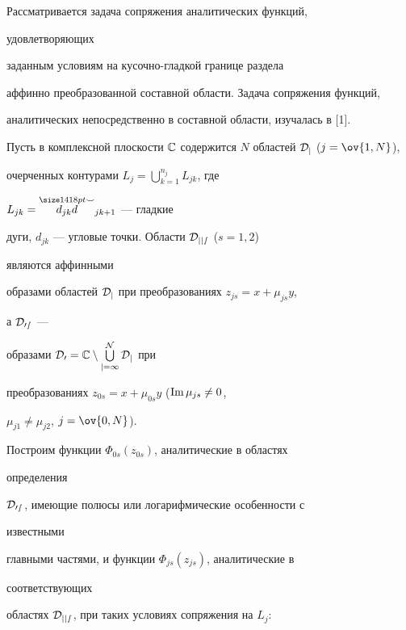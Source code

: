  




\maketitle 


\label{begin} 


 


Рассматривается задача сопряжения аналитических функций, 


удовлетворяющих 


заданным условиям на кусочно-гладкой границе раздела 


аффинно преобразованной составной области. Задача сопряжения функций, 


аналитических непосредственно в составной области, изучалась в [1]. 


 


Пусть в комплексной плоскости $\Bbb C$ содержится $N$ областей $\cal 


D_j$ ($j=\ov{1,N}$), 


очерченных контурами $L_j=\bigcup\limits^{n_j}_{k=1}L_{jk}$, где 


$L_{jk}=\overset{\Smile}{d_{jk}d}{}_{jk+1}$ --- гладкие 


дуги, $d_{jk}$ --- угловые точки. Области $\cal D_{jjs}$ ($s=1,2$) 


являются аффинными 


образами областей $\cal D_j$ при преобразованиях $z_{js}=x+\mu_{js}y$, 


а $\cal D_{0s}$ --- 


образами $\cal D_0=\Bbb C\setminus\bigcup\limits^N_{j=1}\cal D_j$ при 


преобразованиях $z_{0s}=x+\mu_{0s}y$ ($\operatorname{Im}\mu_{js}\ne0$, 


$\mu_{j1}\ne\mu_{j2}$, $j=\ov{0,N}$). 


Построим функции $\Phi_{0s}(z_{0s})$, аналитические в областях 


определения 


$\cal D_{0s}$, имеющие полюсы или логарифмические особенности с 


известными 


главными частями, и функции $\Phi_{js}(z_{js})$, аналитические в 


соответствующих 


областях $\cal D_{jjs}$, при таких условиях сопряжения на $L_j$: 


